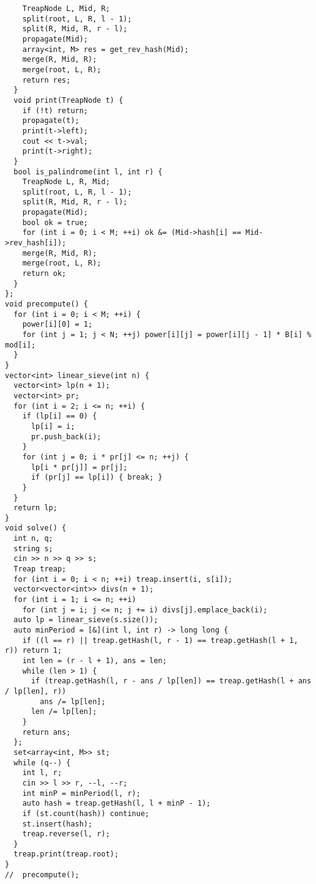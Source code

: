 \documentclass[twoside]{article}
\begin{document}
\begin{multicols*}{2}
\begin{verbatim}
    TreapNode L, Mid, R;
    split(root, L, R, l - 1);
    split(R, Mid, R, r - l);
    propagate(Mid);
    array<int, M> res = get_rev_hash(Mid);
    merge(R, Mid, R);
    merge(root, L, R);
    return res;
  }
  void print(TreapNode t) {
    if (!t) return;
    propagate(t);
    print(t->left);
    cout << t->val;
    print(t->right);
  }
  bool is_palindrome(int l, int r) {
    TreapNode L, R, Mid;
    split(root, L, R, l - 1);
    split(R, Mid, R, r - l);
    propagate(Mid);
    bool ok = true;
    for (int i = 0; i < M; ++i) ok &= (Mid->hash[i] == Mid->rev_hash[i]);
    merge(R, Mid, R);
    merge(root, L, R);
    return ok;
  }
};
void precompute() {
  for (int i = 0; i < M; ++i) {
    power[i][0] = 1;
    for (int j = 1; j < N; ++j) power[i][j] = power[i][j - 1] * B[i] % mod[i];
  }
}
vector<int> linear_sieve(int n) {
  vector<int> lp(n + 1);
  vector<int> pr;
  for (int i = 2; i <= n; ++i) {
    if (lp[i] == 0) {
      lp[i] = i;
      pr.push_back(i);
    }
    for (int j = 0; i * pr[j] <= n; ++j) {
      lp[i * pr[j]] = pr[j];
      if (pr[j] == lp[i]) { break; }
    }
  }
  return lp;
}
void solve() {
  int n, q;
  string s;
  cin >> n >> q >> s;
  Treap treap;
  for (int i = 0; i < n; ++i) treap.insert(i, s[i]);
  vector<vector<int>> divs(n + 1);
  for (int i = 1; i <= n; ++i)
    for (int j = i; j <= n; j += i) divs[j].emplace_back(i);
  auto lp = linear_sieve(s.size());
  auto minPeriod = [&](int l, int r) -> long long {
    if ((l == r) || treap.getHash(l, r - 1) == treap.getHash(l + 1, r)) return 1;
    int len = (r - l + 1), ans = len;
    while (len > 1) {
      if (treap.getHash(l, r - ans / lp[len]) == treap.getHash(l + ans / lp[len], r))
        ans /= lp[len];
      len /= lp[len];
    }
    return ans;
  };
  set<array<int, M>> st;
  while (q--) {
    int l, r;
    cin >> l >> r, --l, --r;
    int minP = minPeriod(l, r);
    auto hash = treap.getHash(l, l + minP - 1);
    if (st.count(hash)) continue;
    st.insert(hash);
    treap.reverse(l, r);
  }
  treap.print(treap.root);
}
//  precompute();
\end{verbatim}

{
}
\end{multicols*}
\end{document}
